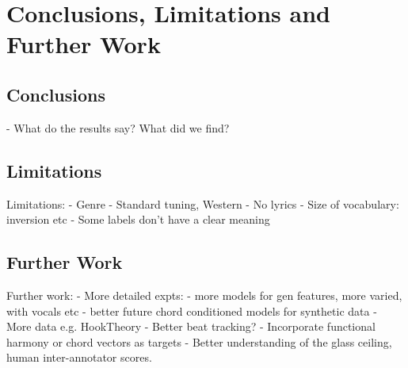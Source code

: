 
\chapter{Conclusions, Limitations and Further Work}

\section{Conclusions}

- What do the results say? What did we find?

\section{Limitations}
Limitations:
- Genre
- Standard tuning, Western
- No lyrics
- Size of vocabulary: inversion etc
- Some labels don't have a clear meaning

\section{Further Work}
Further work:
- More detailed expts:
    - more models for gen features, more varied, with vocals etc
    - better future chord conditioned models for synthetic data
- More data e.g. HookTheory
- Better beat tracking?
- Incorporate functional harmony or chord vectors as targets
- Better understanding of the glass ceiling, human inter-annotator scores.